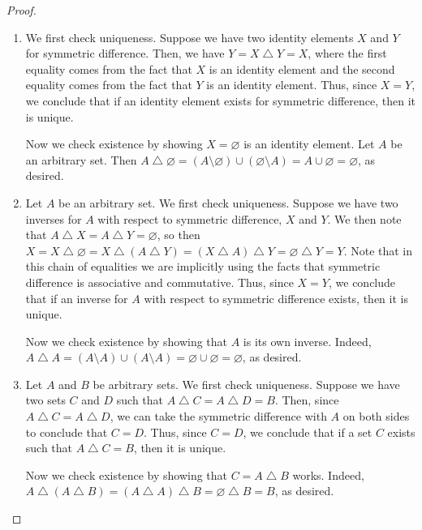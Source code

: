 \documentclass[12pt]{amsart}
\theoremstyle{definition}
\theoremstyle{remark}
\begin{document}
\begin{proof}
\hfill
\begin{enumerate}
	\item We first check uniqueness.
	Suppose we have two identity elements $X$ and $Y$ for symmetric difference.
	Then, we have $Y = X \bigtriangleup Y = X$, where the first equality comes from the fact
	that $X$ is an identity element and the second equality comes from the fact that $Y$
	is an identity element.
	Thus, since $X = Y$, we conclude that if an identity element exists for symmetric difference,
	then it is unique.
	
	Now we check existence by showing $X = \varnothing$ is an identity element.
	Let $A$ be an arbitrary set.
	Then $A \bigtriangleup \varnothing = (A \setminus \varnothing) \cup (\varnothing \setminus A) =
	A \cup \varnothing = \varnothing$, as desired.
	
	\item Let $A$ be an arbitrary set.
	We first check uniqueness.
	Suppose we have two inverses for $A$ with respect to symmetric difference, $X$ and $Y$.
	We then note that $A \bigtriangleup X = A \bigtriangleup Y = \varnothing$, so then
	$X = X \bigtriangleup \varnothing = X \bigtriangleup (A \bigtriangleup Y)
	= (X \bigtriangleup A) \bigtriangleup Y = \varnothing \bigtriangleup Y = Y$.
	Note that in this chain of equalities we are implicitly using the facts that symmetric difference is 
	associative and commutative.
	Thus, since $X = Y$, we conclude that if an inverse for $A$ with respect to symmetric difference
	exists, then it is unique.
	
	Now we check existence by showing that $A$ is its own inverse.
	Indeed, $A \bigtriangleup A = (A \setminus A) \cup (A \setminus A) =
	\varnothing \cup \varnothing = \varnothing$, as desired.
	
	\item Let $A$ and $B$ be arbitrary sets.
	We first check uniqueness.
	Suppose we have two sets $C$ and $D$ such that $A \bigtriangleup C = A \bigtriangleup D = B$.
	Then, since $A \bigtriangleup C = A \bigtriangleup D$, we can take the symmetric difference with
	$A$ on both sides to conclude that $C = D$.
	Thus, since $C = D$, we conclude that if a set $C$ exists such that $A \bigtriangleup C = B$,
	then it is unique.
	
	Now we check existence by showing that $C = A \bigtriangleup B$ works.
	Indeed, $A \bigtriangleup (A \bigtriangleup B) = (A \bigtriangleup A) \bigtriangleup B
	= \varnothing \bigtriangleup B = B$, as desired.
	

\end{enumerate}
\end{proof}
\end{document}

